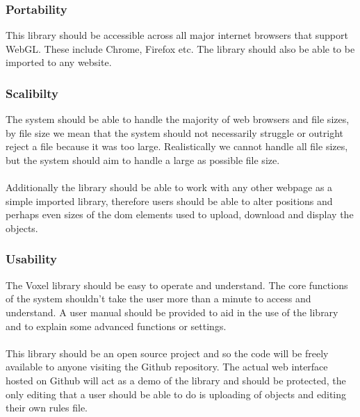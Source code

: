 \documentclass[english]{article}
\begin{document}
		\subsubsection{Portability}
		This library should be accessible across all major internet browsers that support WebGL. These include Chrome, Firefox etc.
		The library should also be able to be imported to any website.
		
		\subsubsection{Scalibilty}
		The system should be able to handle the majority of web browsers and file sizes, by file size we mean that the system should not necessarily struggle or outright reject a file because it was too large. Realistically we cannot handle all file sizes, but the system should aim to handle a large as possible file size. 
		\\\\
		Additionally the library should be able to work with any other webpage as a simple imported library, therefore users should be able to alter positions and perhaps even sizes of the dom elements used to upload, download and display the objects.
		
		
		\subsubsection{Usability}
		The Voxel library should be easy to operate and understand. The core functions of the system shouldn't take the user more 
		than a minute to access and understand. A user manual should be provided to aid in the use of the library and to explain some advanced functions or settings.\\\\
		This library should be an open source project and so the code will be freely available to anyone visiting the Github repository. The actual web interface hosted on Github will act as a demo of the library and should be protected, the only editing that a user should be able to do is uploading of objects and editing their own rules file.
		
		
	\pagebreak
	
\end{document}

